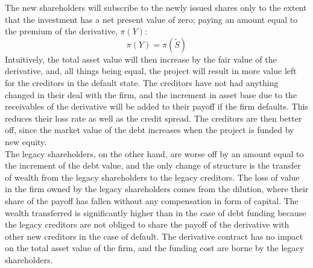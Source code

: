 \documentclass[../main.tex]{subfiles}
\begin{document}
        The new shareholders will subscribe to the newly issued shares only to the extent that the investment has a net present value of zero; paying an amount equal to the premium of the derivative, $\pi(Y)$:
        \begin{equation}\label{eqn:derivative-zero-npv}
            \pi(Y) = \pi(\tilde{S})
        \end{equation}
        Intuitively, the total asset value will then increase by the fair value of the derivative, and, all things being equal, the project will result in more value left for the creditors in the default state. 
        The creditors have not had anything changed in their deal with the firm, and the increment in asset base due to the receivables of the derivative will be added to their payoff if the firm defaults. 
        This reduces their loss rate as well as the credit spread.
        The creditors are then better off, since the market value of the debt increases when the project is funded by new equity.\\
        The legacy shareholders, on the other hand, are worse off by an amount equal to the increment of the debt value, and the only change of structure is the transfer of wealth from the legacy shareholders to the legacy creditors. 
        The loss of value in the firm owned by the legacy shareholders comes from the dilution, where their share of the payoff has fallen without any compensation in form of capital. 
        The wealth transferred is significantly higher than in the case of debt funding because the legacy creditors are not obliged to share the payoff of the derivative with other new creditors in the case of default. 
        The derivative contract has no impact on the total asset value of the firm, and the funding cost are borne by the legacy shareholders.
\end{document}

